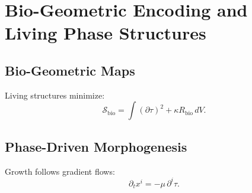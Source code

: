 \chapter{Bio-Geometric Encoding and Living Phase Structures}

\section{Bio-Geometric Maps}
Living structures minimize:
\[
\mathcal{S}_{\mathrm{bio}} = \int (\partial\tau)^2 + \kappa R_{\mathrm{bio}}\, dV.
\]

\section{Phase-Driven Morphogenesis}
Growth follows gradient flows:
\[
\partial_t x^i = -\mu\, \partial^i \tau.
\]
